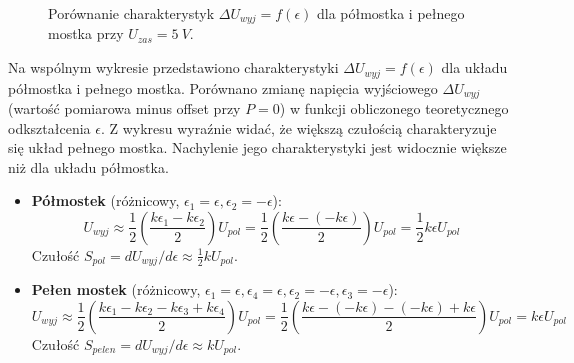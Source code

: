 \documentclass[12pt, a4paper]{article}
\begin{document}
	\begin{figure}[H]
		\centering
		\caption{Porównanie charakterystyk $\Delta U_{wyj} = f(\epsilon)$ dla półmostka i pełnego mostka przy $U_{zas}=5~V$.}
	\end{figure}
	
	Na wspólnym wykresie przedstawiono charakterystyki $\Delta U_{wyj} = f(\epsilon)$ dla układu półmostka i pełnego mostka. Porównano zmianę napięcia wyjściowego $\Delta U_{wyj}$ (wartość pomiarowa minus offset przy $P=0$) w funkcji obliczonego teoretycznego odkształcenia $\epsilon$. Z wykresu wyraźnie widać, że większą czułością charakteryzuje się układ pełnego mostka. Nachylenie jego charakterystyki jest widocznie większe niż dla układu półmostka.
	
		\begin{itemize}
			\item \textbf{Półmostek} (różnicowy, $\epsilon_1 = \epsilon, \epsilon_2 = -\epsilon$):
			$$ U_{wyj} \approx \frac{1}{2} \left( \frac{k\epsilon_1 - k\epsilon_2}{2} \right) U_{pol} = \frac{1}{2} \left( \frac{k\epsilon - (-k\epsilon)}{2} \right) U_{pol} = \frac{1}{2} k \epsilon U_{pol} $$
			Czułość $S_{pol} = dU_{wyj}/d\epsilon \approx \frac{1}{2} k U_{pol}$.
			
			\item \textbf{Pełen mostek} (różnicowy, $\epsilon_1 = \epsilon, \epsilon_4 = \epsilon, \epsilon_2 = -\epsilon, \epsilon_3 = -\epsilon$):
			$$ U_{wyj} \approx \frac{1}{2} \left( \frac{k\epsilon_1 - k\epsilon_2 - k\epsilon_3 + k\epsilon_4}{2} \right) U_{pol} = \frac{1}{2} \left( \frac{k\epsilon - (-k\epsilon) - (-k\epsilon) + k\epsilon}{2} \right) U_{pol} = k \epsilon U_{pol} $$
			Czułość $S_{pelen} = dU_{wyj}/d\epsilon \approx k U_{pol}$.
		\end{itemize}
	
\end{document}
